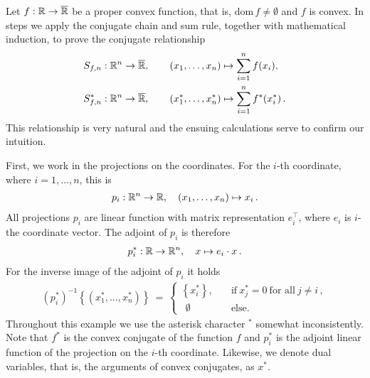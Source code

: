 \begin{example*}
  Let 
  $
    f:\mathbb{R}\to \overline{\mathbb{R}}
  $
  be a proper convex function, that is, 
  $
    \mathrm{dom}\,f
    \neq
    \emptyset
  $
  and $f$ is convex.
  In steps we apply the conjugate chain and sum rule, together with mathematical induction,
  to prove the conjugate relationship 
  \begin{align*}
    &S_{f,n}:\mathbb{R}^n \to \overline{\mathbb{R}},
    \qquad
    (x_1,\ldots,x_n)
    \mapsto
    \sum_{i=1}^{n} 
    f(x_i)
    ,
    \\
    &S_{f,n}^*:\mathbb{R}^n \to \overline{\mathbb{R}},
    \qquad
    (x^*_1,\ldots,x^*_n)
    \mapsto
    \sum_{i=1}^{n} 
    f^*(x^*_i)
    \,.
  \end{align*}
  This relationship is very natural and the ensuing calculations serve to confirm our intuition.

  First, we work in the projections on the coordinates. 
  For the $i$-th coordinate, where $i=1,\ldots,n$, this is 
  \begin{gather}
    p_i:\mathbb{R}^n\to \mathbb{R}
    ,
    \quad
    (x_1,\ldots,x_n)
    \mapsto
    x_i\,.
  \end{gather}
  All projections 
  $p_i$
  are linear function with matrix representation
  $
    e_i^\top
  $,
  where $e_i$ is $i$-the coordinate vector.
  The adjoint of $p_i$ is therefore
  \begin{gather}
    p^*_i:\mathbb{R}\to \mathbb{R}^n
    ,
    \quad
    x
    \mapsto
    e_i\cdot x
    \,.
  \end{gather}
  For the inverse image of the adjoint of $p_i$ it holds
  \begin{gather}
    (p_i^*)^{-1}
    \left\{ 
    (x_1^*,\ldots,x_n^*)
    \right\}
    \ 
    =
    \ 
    \begin{cases}
      \left\{ x_i^* \right\},
      \quad
      &\text{if}\ 
      x_j^*=0\ \text{for all}\ j\neq i\,,
      \\
      \ \ \emptyset
      \quad
      &\text{else.}
    \end{cases}
  \end{gather}
  Throughout this example we use the asterisk character $^*$ somewhat inconsistently. 
  Note that $f^*$ is the convex conjugate 
  of the function $f$ and $p_i^*$ is the adjoint linear function of the projection on the $i$-th coordinate. Likewise, we denote dual variables, that is, the arguments of convex conjugates, as $x^*$.


\end{example*}
